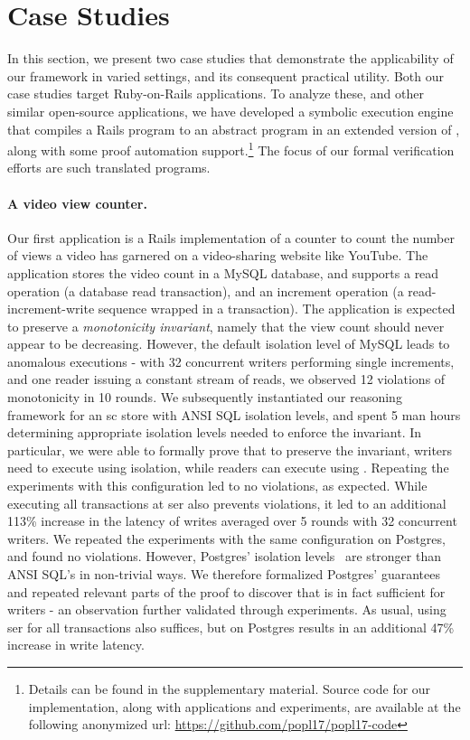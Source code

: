 \section{Case Studies}
\label{sec:case-studies}

In this section, we present two case studies that demonstrate the
applicability of our framework in varied settings, and its consequent
practical utility. Both our case studies target Ruby-on-Rails
applications. To analyze these, and other similar open-source
applications, we have developed a symbolic execution engine that
compiles a Rails program to an abstract program in an extended version
of \txnimp, along with some proof automation support.\footnote{Details
   can be found in the supplementary material.  Source code for our
  implementation, along with applications and experiments, are
  available at the following anonymized url:
  \url{https://github.com/popl17/popl17-code}} The focus of
our formal verification efforts are such translated \txnimp programs.

\paragraph{A video view counter.} Our first application is a Rails
implementation of a counter to count the number of views a video has
garnered on a video-sharing website like YouTube. The application
stores the video count in a MySQL database, and supports a read
operation (a database read transaction), and an increment operation (a
read-increment-write sequence wrapped in a transaction).  The
application is expected to preserve a \emph{monotonicity invariant},
namely that the view count should never appear to be decreasing.
However, the default  isolation level of MySQL
leads to anomalous executions - with 32 concurrent writers performing
single increments, and one reader issuing a constant stream of reads,
we observed 12 violations of monotonicity in 10 rounds. We
subsequently instantiated our reasoning framework for an {\sc sc}
store with ANSI SQL isolation levels, and spent 5 man hours
determining appropriate isolation levels needed to enforce the
invariant. In particular, we were able to formally prove that to
preserve the invariant, writers need to execute using
 isolation, while readers can execute using
. Repeating the experiments with this
configuration led to no violations, as expected. While executing all
transactions at {\sc ser} also prevents violations, it led to an
additional 113\% increase in the latency of writes averaged over 5
rounds with 32 concurrent writers.  We repeated the experiments with
the same configuration on Postgres, and found no violations. However,
Postgres' isolation levels~\cite{postgresiso} are stronger than ANSI
SQL's in non-trivial ways. We therefore formalized Postgres'
guarantees and repeated relevant parts of the proof to discover that
 is in fact sufficient for writers - an
observation further validated through experiments. As usual, using
{\sc ser} for all transactions also suffices, but on Postgres results
in an additional 47\% increase in write latency.


